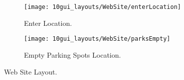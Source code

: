 \begin{figure}[H]
	\centering
	\begin{subfigure}{.5\textwidth}
		\centering
		\texttt{[image: 10gui\_layouts/WebSite/enterLocation]}
		\caption{Enter Location.}
		\label{fig:enterLocation}
	\end{subfigure}%
	\begin{subfigure}{.5\textwidth}
		\centering
		\texttt{[image: 10gui\_layouts/WebSite/parksEmpty]}
		\caption{Empty Parking Spots Location.}
		\label{fig:parksEmpty}
	\end{subfigure}
	\caption{Web Site Layout.}
	\label{fig:webSite}
\end{figure}



